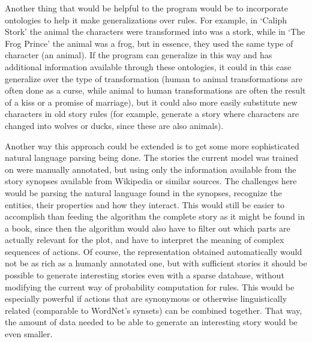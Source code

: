 Another thing that would be helpful to the program would be to incorporate
ontologies to help it make generalizations over rules.
For example, in `Caliph Stork' the animal the characters were transformed into
was a stork, while in `The Frog Prince' the animal was a frog, but in essence,
they used the same type of character (an animal). If the program can generalize
in this way and has additional information available through these ontologies,
it could in this case generalize over the type of transformation (human to
animal transformations are often done as a curse, while animal to human
transformations are often the result of a kiss or a promise of marriage), but it
could also more easily substitute new characters in old story rules (for
example, generate a story where characters are changed into wolves or ducks,
since these are also animals).

Another way this approach could be extended is to get some more sophisticated
natural language parsing being done. The stories the current model was trained
on were manually annotated, but using only the information available from the
story synopses available from Wikipedia or similar sources. The challenges here
would be parsing the natural language found in the synopses, recognize the
entities, their properties and how they interact.
This would still be easier to accomplish than feeding the algorithm the complete
story as it might be found in a book, since then the algorithm would also have
to filter out which parts are actually relevant for the plot, and have to
interpret the meaning of complex sequences of actions.
Of course, the representation obtained automatically would not be as rich as a
humanly annotated one, but with sufficient stories it should be possible to
generate interesting stories even with a sparse database, without modifying the
current way of probability computation for rules. This would be especially
powerful if actions that are synonymous or otherwise linguistically related
(comparable to WordNet's synsets) can be combined together. That way, the amount
of data needed to be able to generate an interesting story would be even
smaller.
